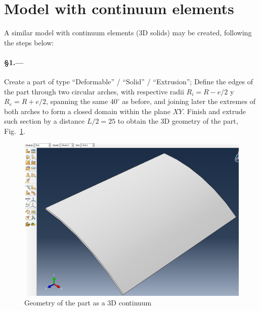 \documentclass[english,a4paper,12pt]{article}
\begin{document}
\section{Model with continuum elements}
A similar model with continuum elements (3D solids) may be created, following the steps below:
\paragraph{\S1.---}
Create a part of type ``Deformable'' / ``Solid'' / ``Extrusion'';
Define the edges of the part through two circular arches, with respective radii $R_{i}=R-e/2$ y $R_{e}=R+e/2$, spanning the same $40^{\circ}$ as before, and joining later the extremes of both arches to form a closed domain within the plane $XY$.
Finish and extrude such section by a distance $L/2=25$ to obtain the 3D geometry of the part, Fig.~\ref{fig:part-solid}.
\begin{figure}[h!tp]
\centering
\includegraphics[scale=0.3]{capturas/40-part-solid.png}
\caption{Geometry of the part as a 3D continuum}
\label{fig:part-solid}
\end{figure}
\end{document}
